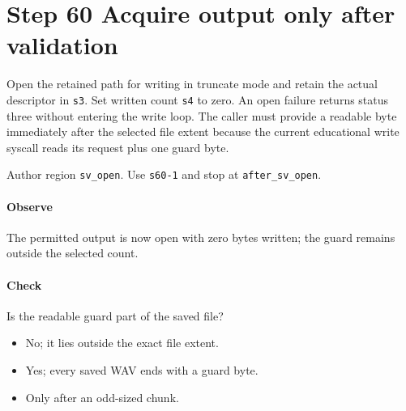 \section{Step 60 Acquire output only after validation}\label{pcm-wav-s60}
Open the retained path for writing in truncate mode and retain the actual descriptor in \texttt{s3}. Set written count \texttt{s4} to zero. An open failure returns status three without entering the write loop. The caller must provide a readable byte immediately after the selected file extent because the current educational write syscall reads its request plus one guard byte.

Author region \texttt{sv\_open}. Use \texttt{s60-1} and stop at \texttt{after\_sv\_open}.

\paragraph{Observe} The permitted output is now open with zero bytes written; the guard remains outside the selected count.

\paragraph{Check} Is the readable guard part of the saved file?
\begin{itemize}
  \item[A.] No; it lies outside the exact file extent.
  \item[B.] Yes; every saved WAV ends with a guard byte.
  \item[C.] Only after an odd-sized chunk.
\end{itemize}
